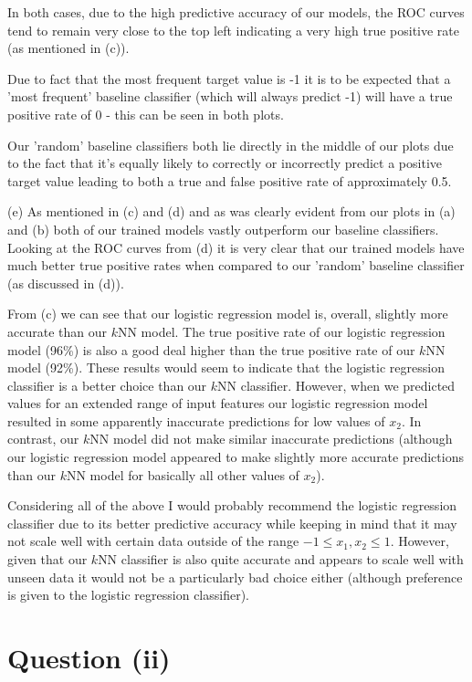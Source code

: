 \documentclass[12pt]{article}
\begin{document}
In both cases, due to the high predictive accuracy of our models, the ROC curves tend to remain very close to the top left indicating a very high true positive rate (as mentioned in (c)).

Due to fact that the most frequent target value is -1 it is to be expected that a 'most frequent' baseline classifier (which will always predict -1) will have a true positive rate of 0 - this can be seen in both plots.

Our 'random' baseline classifiers both lie directly in the middle of our plots due to the fact that it's equally likely to correctly or incorrectly predict a positive target value leading to both a true and false positive rate of approximately 0.5.

\noindent (e) As mentioned in (c) and (d) and as was clearly evident from our plots in (a) and (b) both of our trained models vastly outperform our baseline classifiers. Looking at the ROC curves from (d) it is very clear that our trained models have much better true positive rates when compared to our 'random' baseline classifier (as discussed in (d)).

From (c) we can see that our logistic regression model is, overall, slightly more accurate than our $k$NN model. The true positive rate of our logistic regression model (96\%) is also a good deal higher than the true positive rate of our $k$NN model (92\%). These results would seem to indicate that the logistic regression classifier is a better choice than our $k$NN classifier. However, when we predicted values for an extended range of input features our logistic regression model resulted in some apparently inaccurate predictions for low values of $x_2$. In contrast, our $k$NN model did not make similar inaccurate predictions (although our logistic regression model appeared to make slightly more accurate predictions than our $k$NN model for basically all other values of $x_2$).

Considering all of the above I would probably recommend the logistic regression classifier due to its better predictive accuracy while keeping in mind that it may not scale well with certain data outside of the range $-1 \le x_1, x_2 \le 1$. However, given that our $k$NN classifier is also quite accurate and appears to scale well with unseen data it would not be a particularly bad choice either (although preference is given to the logistic regression classifier).

\section*{Question (ii)}
\end{document}
